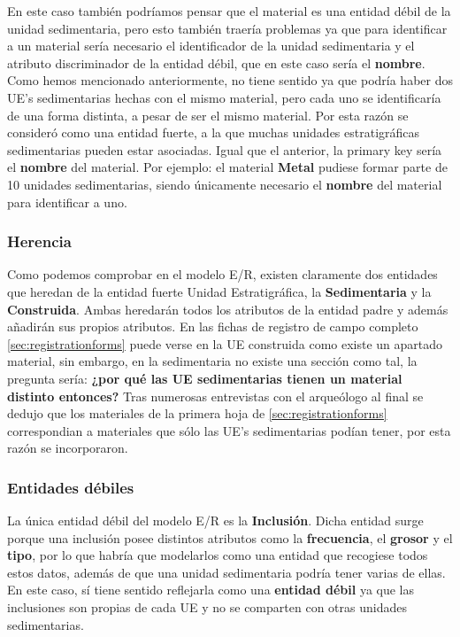 \begin{enumerate}
        En este caso también podríamos pensar que el material es una entidad débil de la unidad
        sedimentaria, pero esto también traería problemas ya que para identificar a un material
        sería necesario el identificador de la unidad sedimentaria y el atributo discriminador
        de la entidad débil, que en este caso sería el \textbf{nombre}. Como hemos mencionado
        anteriormente, no tiene sentido ya que podría haber dos UE's sedimentarias hechas
        con el mismo material, pero cada uno se identificaría de una forma distinta, a pesar
        de ser el mismo material. Por esta razón se consideró como una entidad fuerte, a la
        que muchas unidades estratigráficas sedimentarias pueden estar asociadas. Igual que el
        anterior, la primary key sería el \textbf{nombre} del material. Por ejemplo: el
        material \textbf{Metal} pudiese formar parte de 10 unidades sedimentarias, siendo
        únicamente necesario el \textbf{nombre} del material para identificar a uno. 
    \end{enumerate}

    \subsubsection{Herencia}
    Como podemos comprobar en el modelo E/R, existen claramente dos entidades que heredan de
    la entidad fuerte Unidad Estratigráfica, la \textbf{Sedimentaria} y la \textbf{Construida}.
    Ambas heredarán todos los atributos de la entidad padre y además añadirán sus propios
    atributos. En las fichas de registro de campo completo \ref{sec:registrationforms} puede
    verse en la UE construida como existe un apartado material, sin embargo, en la sedimentaria
    no existe una sección como tal, la pregunta sería: \textbf{¿por qué las UE sedimentarias
    tienen un material distinto entonces?} Tras numerosas entrevistas con el arqueólogo al
    final se dedujo que los materiales de la primera hoja de \ref{sec:registrationforms}
    correspondian a materiales que sólo las UE's sedimentarias podían tener, por esta razón
    se incorporaron.

    \subsubsection{Entidades débiles}
    La única entidad débil del modelo E/R es la \textbf{Inclusión}. Dicha entidad surge porque
    una inclusión posee distintos atributos como la \textbf{frecuencia}, el \textbf{grosor} y
    el \textbf{tipo}, por lo que habría que modelarlos como una entidad que recogiese todos
    estos datos, además de que una unidad sedimentaria podría tener varias de ellas. En este
    caso, sí tiene sentido reflejarla como una \textbf{entidad débil} ya que las inclusiones
    son propias de cada UE y no se comparten con otras unidades sedimentarias.\\

